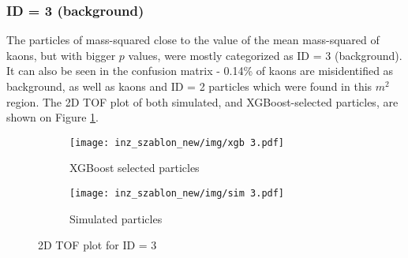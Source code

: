 \subsubsection{ID = 3 (background)}
The particles of mass-squared close to the value of the mean mass-squared of kaons, but with bigger $p$ values, were mostly categorized as ID = 3 (background). It can also be seen in the confusion matrix - 0.14\% of kaons are misidentified as background, as well as kaons and ID = 2 particles which were found in this $m^2$ region. The 2D TOF plot of both simulated, and XGBoost-selected particles, are shown on Figure \ref{2D TOF id3}.
\begin{figure}[H]
 \centering
    \begin{subfigure}[b]{0.8\linewidth} 
        \centering
        \texttt{[image: inz\_szablon\_new/img/xgb 3.pdf]}
        \caption{XGBoost selected particles}
        \vspace{0.3cm}
    \end{subfigure}
     \hfill
       \begin{subfigure}[b]{0.8\linewidth}
        \centering
        \texttt{[image: inz\_szablon\_new/img/sim 3.pdf]}
        \caption{Simulated particles}
        \vspace{0.3cm}
    \end{subfigure}
    \caption{2D TOF plot for ID = 3}
    \label{2D TOF id3}
\end{figure}
\clearpage
